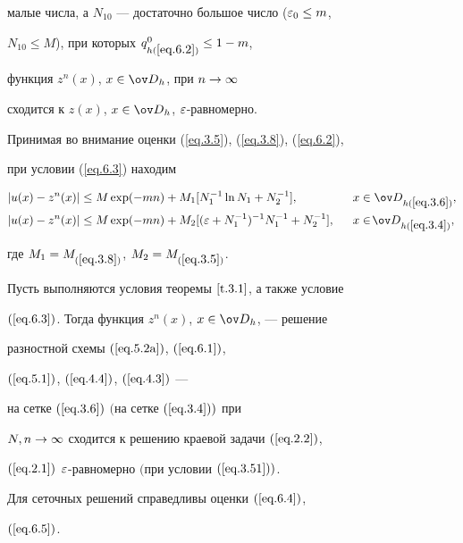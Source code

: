малые числа, а $N_{10}$ --- достаточно большое число ($\varepsilon_0\leq m$,


$N_{10}\leq M$), при которых $q^0_{h(\ref{eq.6.2})}\leq 1-m$,


функция $z^n(x)$, $x\in\od_h$, при $n\rightarrow\infty$


сходится к $z(x)$, $x\in\od_h$, $\varepsilon$-равномерно.





Принимая во внимание оценки (\ref{eq.3.5}), (\ref{eq.3.8}), (\ref{eq.6.2}),


при условии (\ref{eq.6.3}) находим


\begin{alignat}{2} \label{eq.6.4}


|u(x)-z^n(x)| &\leq M \exp (-m n)+M_1 [N_1^{-1} \ln N_1+N_2^{-1}],


& \ \ x&\in\od_{h(\ref{eq.3.6})}, \\


\label{eq.6.5}


|u(x)-z^n(x)|&\leq M \exp (-m n)+M_2 [(\eps + N^{-1}_1)^{-1} N_1^{-1}+


N_2^{-1}],& \ \ x&\in\!\od_{h(\ref{eq.3.4})},


\end{alignat}


где $M_1=M_{(\ref{eq.3.8})}$, $M_2=M_{(\ref{eq.3.5})}$.








\begin{thms} \label{t.6.1}


Пусть выполняются условия теоремы $\ref{t.3.1}$, а также условие


$(\ref{eq.6.3})$. Тогда функция $z^n(x)$, $x\in\od_h$, --- решение


разностной схемы $(\ref{eq.5.2a})$, $(\ref{eq.6.1})$,


$(\ref{eq.5.1})$, $(\ref{eq.4.4})$, $(\ref{eq.4.3})$ ---


на сетке $(\ref{eq.3.6})$ $($на сетке $(\ref{eq.3.4}))$ при


$N, n\rightarrow\infty$ сходится к решению краевой задачи $(\ref{eq.2.2})$,


$(\ref{eq.2.1})$ $\varepsilon$-рав\-но\-мерно $($при условии $(\ref{eq.3.51}))$.


Для сеточных решений справедливы оценки $(\ref{eq.6.4})$,


$(\ref{eq.6.5})$.


\end{thms}








